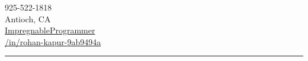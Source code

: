 \documentclass[letterpaper,10pt]{article}
\begin{document}
\begin{multicols}{3}
\begin{minipage}{.33\textwidth}
\begin{flushright}
      \vspace{1em}
      \faMobile*\hspace{4px}925-522-1818 \\
      \vspace{1em}
      \faLocationArrow\hspace{4px}Antioch, CA \\
      \vspace{1em}
      \faGithub\hspace{4px}\href{https://github.com/ImpregnableProgrammer}{ImpregnableProgrammer} \\
      \vspace{1em}
      \faLinkedin\hspace{4px}\href{https://www.linkedin.com/in/rohan-kapur-9ab9494a}{/in/rohan-kapur-9ab9494a}
    \end{flushright}
  \end{minipage}
\end{multicols}
{\color{magenta}\hrule}
\vspace{.5em}
\end{document}
